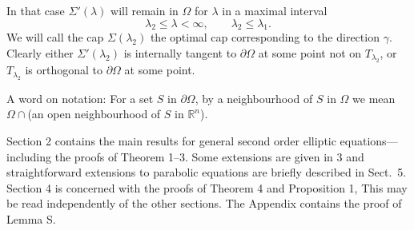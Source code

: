 In that case $\Sigma'(\lambda)$ will remain in $\Omega$ for $\lambda$ in a maximal interval
\[\lambda_2\leq\lambda<\infty,\qquad \lambda_2\leq\lambda_1.\]
We will call the cap $\Sigma(\lambda_2)$ the optimal cap corresponding to the direction $\gamma$. 
Clearly either $\Sigma'(\lambda_2)$ is internally tangent to $\partial\Omega$ 
at some point not on $T_{\lambda_2}$, or $T_{\lambda_2}$ is orthogonal to
$\partial\Omega$ at some point.

A word on notation: For a set $S$ in $\partial\Omega$, by a neighbourhood of $S$ in $\Omega$
we mean $\Omega\cap$(an open neighbourhood of $S$ in $\mathbb{R}^n$).

Section 2 contains the main results for general second order elliptic equations---including 
the proofs of Theorem 1--3. Some extensions are given in 3 and straightforward extensions to 
parabolic equations are briefly described in Sect.~5. Section 4 is concerned with 
the proofs of Theorem 4 and Proposition 1, This may be read independently of the other sections.
The Appendix contains the proof of Lemma S.